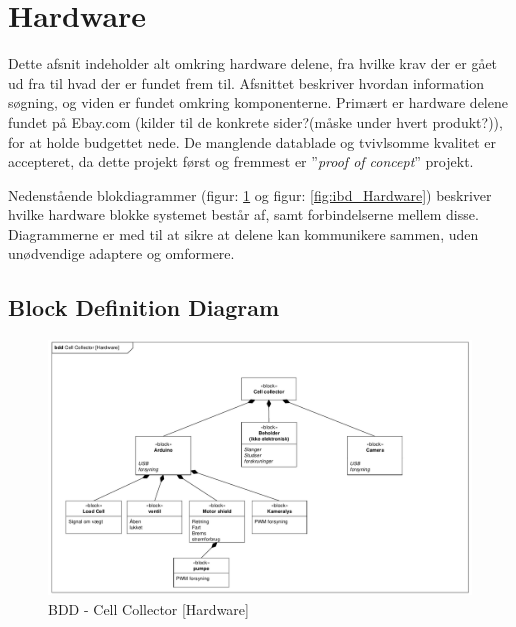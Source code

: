  \section{Hardware}
 Dette afsnit indeholder alt omkring hardware delene, fra hvilke krav der er gået ud fra til hvad der er fundet frem til.  Afsnittet beskriver hvordan information søgning, og viden er fundet omkring komponenterne. Primært er hardware delene  fundet på Ebay.com (kilder til de konkrete sider?(måske under hvert produkt?)), for at holde budgettet nede. De manglende datablade og tvivlsomme kvalitet er accepteret, da dette projekt først og fremmest er  ”\textit{proof of concept}” projekt.

Nedenstående blokdiagrammer (figur: \ref{fig:bdd_Hardware} og figur: \ref{fig:ibd_Hardware}) beskriver hvilke hardware blokke systemet består af, samt forbindelserne mellem disse. Diagrammerne er med til at sikre at delene kan kommunikere sammen, uden unødvendige adaptere og omformere. 
 
\subsection{Block Definition Diagram} 

\begin{figure}[H]
	\centering
	\includegraphics[width=1\textwidth]{pdf/BDD_Hardware_cropped.pdf}
	\caption{BDD - Cell Collector [Hardware]}
	\label{fig:bdd_Hardware}
\end{figure}

